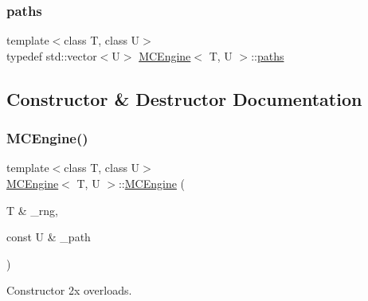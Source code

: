 \subsubsection{\texorpdfstring{paths}{paths}}
{\footnotesize\ttfamily template$<$class T, class U$>$ \\
typedef std\+::vector$<$U$>$ \hyperlink{classMCEngine}{M\+C\+Engine}$<$ T, U $>$\+::\hyperlink{classMCEngine_a977f1048508a1467c496c2c47231d1d3}{paths}}



\subsection{Constructor \& Destructor Documentation}
\hypertarget{classMCEngine_a2021419bc32829220a41a42e0b7ddca3}{}\label{classMCEngine_a2021419bc32829220a41a42e0b7ddca3} 
\subsubsection{\texorpdfstring{M\+C\+Engine()}{MCEngine()}\hspace{0.1cm}{\footnotesize\ttfamily [1/4]}}
{\footnotesize\ttfamily template$<$class T, class U$>$ \\
\hyperlink{classMCEngine}{M\+C\+Engine}$<$ T, U $>$\+::\hyperlink{classMCEngine}{M\+C\+Engine} (\begin{DoxyParamCaption}\item[{T \&}]{\+\_\+rng,  }\item[{const U \&}]{\+\_\+path }\end{DoxyParamCaption})\hspace{0.3cm}{\ttfamily [inline]}}



Constructor 2x overloads. 

\hypertarget{classMCEngine_a1d6bcdacaa99b8f75a89c9b2c344bd0d}{}\label{classMCEngine_a1d6bcdacaa99b8f75a89c9b2c344bd0d} 
